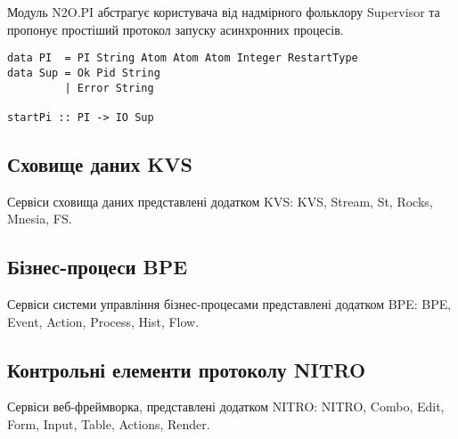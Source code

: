Модуль N2O.PI абстрагує користувача від надмірного
фольклору Supervisor та пропонує простіший протокол запуску
асинхронних процесів.

\begin{lstlisting}
data PI  = PI String Atom Atom Atom Integer RestartType
data Sup = Ok Pid String
         | Error String

startPi :: PI -> IO Sup
\end{lstlisting}

\subsection{Сховище даних KVS}
Сервіси сховища даних представлені додатком KVS: KVS,
Stream, St, Rocks, Mnesia, FS.

\subsection{Бізнес-процеси BPE}
Сервіси системи управління бізнес-процесами
представлені додатком BPE: BPE, Event, Action, Process, Hist, Flow.

\subsection{Контрольні елементи протоколу NITRO}
Сервіси веб-фреймворка, представлені додатком NITRO: NITRO, Combo,
Edit, Form, Input, Table, Actions, Render.


